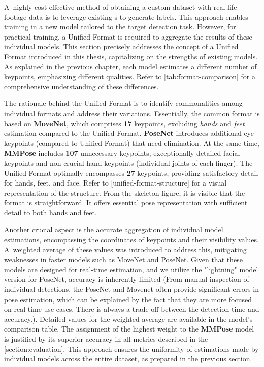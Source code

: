 A~highly cost-effective method of obtaining a custom dataset with real-life footage data is to leverage existing \NN\-s to generate labels. This approach enables training in a new model tailored to the target detection task. However, for practical training, a Unified Format is required to aggregate the results of these individual models. This section precisely addresses the concept of a Unified Format introduced in this thesis, capitalizing on the strengths of existing models. As explained in the previous chapter, each model estimates a different number of keypoints, emphasizing different qualities. Refer to [tab:format-comparison] for a comprehensive understanding of these differences.

The rationale behind the Unified Format is to identify commonalities among individual formats and address their variations. Essentially, the common format is based on {\bf MoveNet}, which comprises {\bf 17} keypoints, excluding {\em hands} and {\em feet} estimation compared to the Unified Format. {\bf PoseNet} introduces additional eye keypoints (compared to Unified Format) that need elimination. At the same time, {\bf MMPose} includes {\bf 107} unnecessary keypoints, exceptionally detailed facial keypoints and non-crucial hand keypoints (individual joints of each finger). The Unified Format optimally encompasses {\bf 27} keypoints, providing satisfactory detail for hands, feet, and face. Refer to [unified-format-structure] for a visual representation of the structure. From the skeleton figure, it is visible that the format is straightforward. It offers essential pose representation with sufficient detail to both hands and feet.

Another crucial aspect is the accurate aggregation of individual model estimations, encompassing the coordinates of keypoints and their visibility values. A~weighted average of these values was introduced to address this, mitigating weaknesses in faster models such as MoveNet and PoseNet. Given that these models are designed for real-time estimation, and we utilize the "lightning" model version for PoseNet, accuracy is inherently limited (From manual inspection of individual detections, the PoseNet and Movenet often provide significant errors in pose estimation, which can be explained by the fact that they are more focused on real-time use-cases. There is always a trade-off between the detection time and accuracy.). Detailed values for the weighted average are available in the model's comparison table. The assignment of the highest weight to the {\bf MMPose} model is justified by its superior accuracy in all metrics described in the [section:evaluation]. This approach ensures the uniformity of estimations made by individual models across the entire dataset, as prepared in the previous section.

